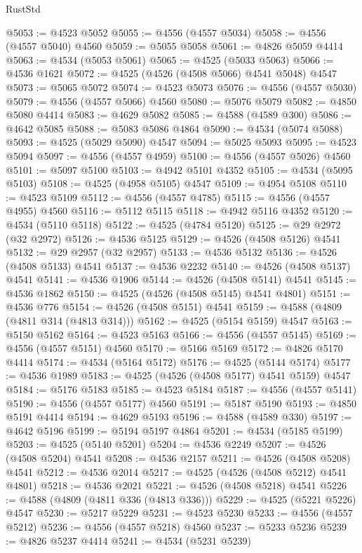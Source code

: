 \begin{lexlean}{RustStd}
\begin{coremodule}
{\begin{coremodule}
{{{{{{{{{{{{{{{{{{{{{{{{{{{{{{{{{{{{{{{{{{{{{{{{{{{{{{{@5053 := @4523 @5052
@5055 := @4556 (@4557 @5034)
@5058 := @4556 (@4557 @5040) @4560
@5059 := @5055 @5058
@5061 := @4826 @5059 @4414
@5063 := @4534 (@5053 @5061)
@5065 := @4525 (@5033 @5063)
@5066 := @4536 @1621
@5072 := @4525 (@4526 (@4508 @5066) @4541 @5048) @4547
@5073 := @5065 @5072
@5074 := @4523 @5073
@5076 := @4556 (@4557 @5030)
@5079 := @4556 (@4557 @5066) @4560
@5080 := @5076 @5079
@5082 := @4850 @5080 @4414
@5083 := @4629 @5082
@5085 := @4588 (@4589 @300)
@5086 := @4642 @5085
@5088 := @5083 @5086 @4864
@5090 := @4534 (@5074 @5088)
@5093 := @4525 (@5029 @5090) @4547
@5094 := @5025 @5093
@5095 := @4523 @5094
@5097 := @4556 (@4557 @4959)
@5100 := @4556 (@4557 @5026) @4560
@5101 := @5097 @5100
@5103 := @4942 @5101 @4352
@5105 := @4534 (@5095 @5103)
@5108 := @4525 (@4958 @5105) @4547
@5109 := @4954 @5108
@5110 := @4523 @5109
@5112 := @4556 (@4557 @4785)
@5115 := @4556 (@4557 @4955) @4560
@5116 := @5112 @5115
@5118 := @4942 @5116 @4352
@5120 := @4534 (@5110 @5118)
@5122 := @4525 (@4784 @5120)
@5125 := @29 @2972 (@32 @2972)
@5126 := @4536 @5125
@5129 := @4526 (@4508 @5126) @4541
@5132 := @29 @2957 (@32 @2957)
@5133 := @4536 @5132
@5136 := @4526 (@4508 @5133) @4541
@5137 := @4536 @2232
@5140 := @4526 (@4508 @5137) @4541
@5141 := @4536 @1906
@5144 := @4526 (@4508 @5141) @4541
@5145 := @4536 @1862
@5150 := @4525 (@4526 (@4508 @5145) @4541 @4801)
@5151 := @4536 @776
@5154 := @4526 (@4508 @5151) @4541
@5159 := @4588 (@4809 (@4811 @314 (@4813 @314)))
@5162 := @4525 (@5154 @5159) @4547
@5163 := @5150 @5162
@5164 := @4523 @5163
@5166 := @4556 (@4557 @5145)
@5169 := @4556 (@4557 @5151) @4560
@5170 := @5166 @5169
@5172 := @4826 @5170 @4414
@5174 := @4534 (@5164 @5172)
@5176 := @4525 (@5144 @5174)
@5177 := @4536 @1989
@5183 := @4525 (@4526 (@4508 @5177) @4541 @5159) @4547
@5184 := @5176 @5183
@5185 := @4523 @5184
@5187 := @4556 (@4557 @5141)
@5190 := @4556 (@4557 @5177) @4560
@5191 := @5187 @5190
@5193 := @4850 @5191 @4414
@5194 := @4629 @5193
@5196 := @4588 (@4589 @330)
@5197 := @4642 @5196
@5199 := @5194 @5197 @4864
@5201 := @4534 (@5185 @5199)
@5203 := @4525 (@5140 @5201)
@5204 := @4536 @2249
@5207 := @4526 (@4508 @5204) @4541
@5208 := @4536 @2157
@5211 := @4526 (@4508 @5208) @4541
@5212 := @4536 @2014
@5217 := @4525 (@4526 (@4508 @5212) @4541 @4801)
@5218 := @4536 @2021
@5221 := @4526 (@4508 @5218) @4541
@5226 := @4588 (@4809 (@4811 @336 (@4813 @336)))
@5229 := @4525 (@5221 @5226) @4547
@5230 := @5217 @5229
@5231 := @4523 @5230
@5233 := @4556 (@4557 @5212)
@5236 := @4556 (@4557 @5218) @4560
@5237 := @5233 @5236
@5239 := @4826 @5237 @4414
@5241 := @4534 (@5231 @5239)
}}}}}}}}}}}}}}}}}}}}}}}}}}}}}}}}}}}}}}}}}}}}}}}}}}}}}}}
\end{coremodule}}
\end{coremodule}
\end{lexlean}
